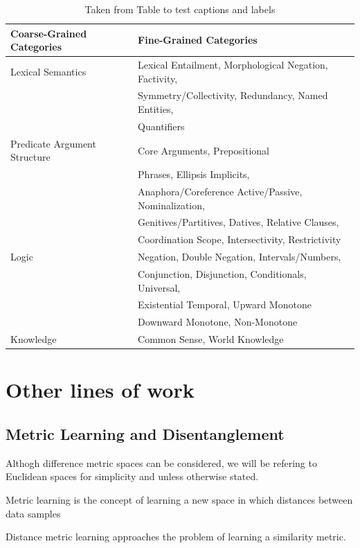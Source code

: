 \documentclass[a4paper,12pt,twoside,openright]{report}
\begin{document}
\begin{table}[h!]
\centering
\begin{tabular}{l l} 
 \hline
 Coarse-Grained Categories & Fine-Grained Categories \\ [0.5ex] 
 \hline
 Lexical Semantics & Lexical Entailment, Morphological Negation, Factivity, \\
&  Symmetry/Collectivity, Redundancy, Named Entities, \\
& Quantifiers \\ 
Predicate Argument Structure & Core Arguments, Prepositional \\ & Phrases, Ellipsis \/ Implicits, \\
& Anaphora/Coreference Active/Passive, Nominalization, \\
& Genitives/Partitives, Datives, Relative Clauses, \\
& Coordination Scope, Intersectivity, Restrictivity \\
Logic & Negation, Double Negation, Intervals/Numbers, \\
& Conjunction, Disjunction, Conditionals, Universal, \\
& Existential Temporal, Upward Monotone \\
& Downward Monotone, Non-Monotone \\
Knowledge & Common Sense, World Knowledge \\ [1ex] 
\hline
\end{tabular}
\caption{Taken from \cite{wang19} Table to test captions and labels}
\label{table:1}
\end{table}

\chapter{Other lines of work}

\section{Metric Learning and Disentanglement}

Althogh difference metric spaces can be considered, we will be refering to Euclidean spaces for simplicity and unless otherwise stated.

Metric learning is the concept of learning a new space in which distances between data samples 

Distance metric learning approaches the problem of learning a similarity metric.
\end{document}
